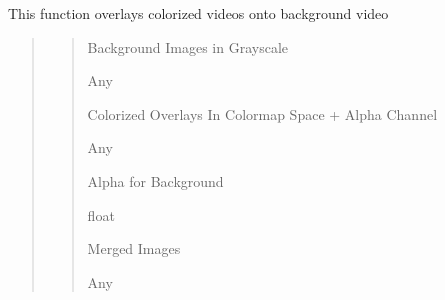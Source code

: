 \documentclass[letterpaper,10pt,english]{sphinxmanual}
\begin{document}
\begin{fulllineitems}
\label{\detokenize{Coloring:Coloring.overlay_colorized_rois}}
\pysigstartsignatures
{}
\pysigstopsignatures
\sphinxAtStartPar
This function overlays colorized videos onto background video
\begin{quote}
\begin{quote}\begin{description}
\sphinxAtStartPar
Background Images in Grayscale

\sphinxAtStartPar
Any

\sphinxAtStartPar
Colorized Overlays In Colormap Space + Alpha Channel

\sphinxAtStartPar
Any

\sphinxAtStartPar
Alpha for Background

\sphinxAtStartPar
float

\sphinxAtStartPar
Merged Images

\sphinxAtStartPar
Any

\end{description}\end{quote}
\end{quote}

\end{fulllineitems}

\end{document}
